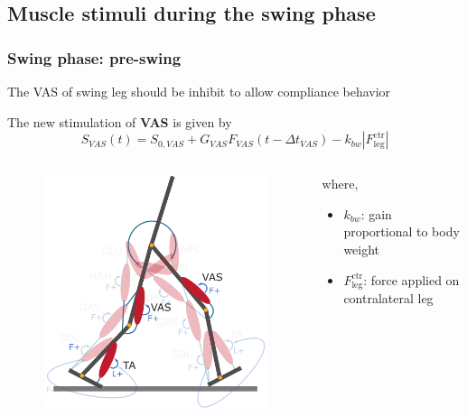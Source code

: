 \documentclass[10pt]{beamer}
\begin{document}
\subsection[Methodology]{Muscle stimuli during the swing phase}
\begin{frame}
	\frametitle{Swing phase: pre-swing}
	The VAS of swing leg should be inhibit to allow compliance behavior 
	\begin{block}{}
		The new stimulation of \textbf{VAS} is given by
		\begin{equation*}
			S_{VAS}(t)=S_{0,VAS} + G_{VAS} F_{VAS} (t-\Delta t_{VAS}) - k_{bw}|F_{\textrm{leg}}^{\textrm{ctr}}|
		\end{equation*}
	\end{block}
	
	\begin{columns}
		\begin{column}{.5\textwidth}
			\begin{figure}
				\centering
				\includegraphics[width=.5\textheight]{images/new_model/swing/muscle_start.pdf}
			\end{figure}
		\end{column}
		\begin{column}{.5\textwidth}
			where,
			\begin{itemize}
				\item $k_{bw}$: gain proportional to body weight
				\item $F_{\textrm{leg}}^{\textrm{ctr}}$: force applied on contralateral leg
			\end{itemize}
		\end{column}
	\end{columns}	
\end{frame}
\end{document}
